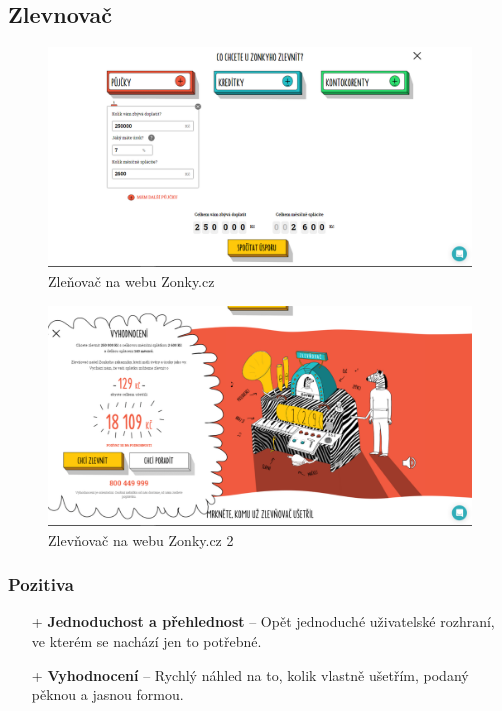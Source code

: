 \newpage
\subsection{Zlevnovač}
\begin{figure}[h]
    \centering
    \includegraphics[width=1.0\textwidth]{media/zonky/zlevnovac.png}
    \caption{Zleňovač na webu Zonky.cz}
    \label{fig:zonky:zlevnovac}
\end{figure}
\begin{figure}[h]
    \centering
    \includegraphics[width=1.0\textwidth]{media/zonky/zlevnovac2.png}
    \caption{Zlevňovač na webu Zonky.cz 2}
    \label{fig:zonky:zlevnovac2}
\end{figure}
\subsubsection*{Pozitiva}
\begin{itemize}
    \item[+] \textbf{Jednoduchost a přehlednost} -- Opět jednoduché uživatelské rozhraní, ve kterém se nachází jen to potřebné.
    \item[+] \textbf{Vyhodnocení} -- Rychlý náhled na to, kolik vlastně ušetřím, podaný pěknou a jasnou formou.
\end{itemize}
